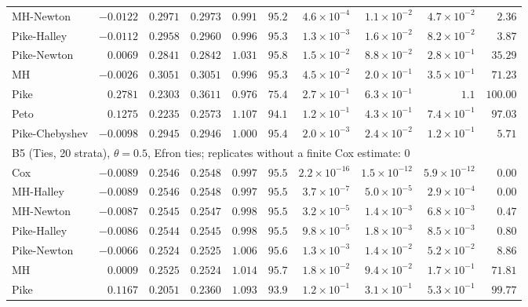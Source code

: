 \begin{landscape}
\begin{longtable}{lrrrrrrrrr}
MH-Newton & $-0.0122$ & $0.2971$ & $0.2973$ & $0.991$ & $95.2$ & $4.6 \times 10^{-4}$ & $1.1 \times 10^{-2}$ & $4.7 \times 10^{-2}$ & $2.36$ \\
Pike-Halley & $-0.0112$ & $0.2958$ & $0.2960$ & $0.996$ & $95.3$ & $1.3 \times 10^{-3}$ & $1.6 \times 10^{-2}$ & $8.2 \times 10^{-2}$ & $3.87$ \\
Pike-Newton & $0.0069$ & $0.2841$ & $0.2842$ & $1.031$ & $95.8$ & $1.5 \times 10^{-2}$ & $8.8 \times 10^{-2}$ & $2.8 \times 10^{-1}$ & $35.29$ \\
MH & $-0.0026$ & $0.3051$ & $0.3051$ & $0.996$ & $95.3$ & $4.5 \times 10^{-2}$ & $2.0 \times 10^{-1}$ & $3.5 \times 10^{-1}$ & $71.23$ \\
Pike & $0.2781$ & $0.2303$ & $0.3611$ & $0.976$ & $75.4$ & $2.7 \times 10^{-1}$ & $6.3 \times 10^{-1}$ & $1.1$ & $100.00$ \\
Peto & $0.1275$ & $0.2235$ & $0.2573$ & $1.107$ & $94.1$ & $1.2 \times 10^{-1}$ & $4.3 \times 10^{-1}$ & $7.4 \times 10^{-1}$ & $97.03$ \\
Pike-Chebyshev & $-0.0098$ & $0.2945$ & $0.2946$ & $1.000$ & $95.4$ & $2.0 \times 10^{-3}$ & $2.4 \times 10^{-2}$ & $1.2 \times 10^{-1}$ & $5.71$ \\
\multicolumn{10}{l}{B5 (Ties, 20 strata), $\theta = 0.5$, Efron ties; replicates without a finite Cox estimate: 0} \\
Cox & $-0.0089$ & $0.2546$ & $0.2548$ & $0.997$ & $95.5$ & $2.2 \times 10^{-16}$ & $1.5 \times 10^{-12}$ & $5.9 \times 10^{-12}$ & $0.00$ \\
MH-Halley & $-0.0089$ & $0.2546$ & $0.2548$ & $0.997$ & $95.5$ & $3.7 \times 10^{-7}$ & $5.0 \times 10^{-5}$ & $2.9 \times 10^{-4}$ & $0.00$ \\
MH-Newton & $-0.0087$ & $0.2545$ & $0.2547$ & $0.998$ & $95.5$ & $3.2 \times 10^{-5}$ & $1.4 \times 10^{-3}$ & $6.8 \times 10^{-3}$ & $0.47$ \\
Pike-Halley & $-0.0086$ & $0.2544$ & $0.2545$ & $0.998$ & $95.5$ & $9.8 \times 10^{-5}$ & $1.8 \times 10^{-3}$ & $8.5 \times 10^{-3}$ & $0.80$ \\
Pike-Newton & $-0.0066$ & $0.2524$ & $0.2525$ & $1.006$ & $95.6$ & $1.3 \times 10^{-3}$ & $1.4 \times 10^{-2}$ & $5.2 \times 10^{-2}$ & $8.86$ \\
MH & $0.0009$ & $0.2525$ & $0.2524$ & $1.014$ & $95.7$ & $1.8 \times 10^{-2}$ & $9.4 \times 10^{-2}$ & $1.7 \times 10^{-1}$ & $71.81$ \\
Pike & $0.1167$ & $0.2051$ & $0.2360$ & $1.093$ & $93.9$ & $1.2 \times 10^{-1}$ & $3.1 \times 10^{-1}$ & $5.3 \times 10^{-1}$ & $99.77$ \\

\end{longtable}
\end{landscape}
